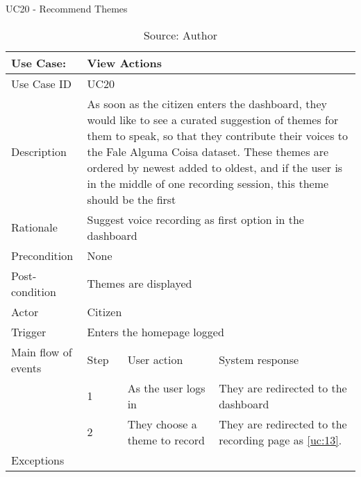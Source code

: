 \begin{table}[h]
\centering
\caption{UC20 - Recommend Themes}
\label{uc:20}
\begin{tabular}{|p{3cm}|p{1cm}|p{5cm}|p{5cm}|}
\hline
Use Case:       & \multicolumn{3}{p{11cm}|}{View Actions} \\ \hline
Use Case ID     & \multicolumn{3}{p{11cm}|}{UC20} \\ \hline
Description     & \multicolumn{3}{p{11cm}|}{As soon as the citizen enters the dashboard, they would like to see a curated suggestion of themes for them to speak, so that they contribute their voices to the Fale Alguma Coisa dataset. These themes are ordered by newest added to oldest, and if the user is in the middle of one recording session, this theme should be the first} \\ \hline
Rationale       & \multicolumn{3}{p{11cm}|}{Suggest voice recording as first option in the dashboard} \\ \hline
Precondition    & \multicolumn{3}{p{11cm}|}{None} \\ \hline
Post-condition  & \multicolumn{3}{p{11cm}|}{Themes are displayed} \\ \hline
Actor           & \multicolumn{3}{p{11cm}|}{Citizen} \\ \hline
Trigger         & \multicolumn{3}{p{11cm}|}{Enters the homepage logged} \\ \hline
Main flow of events & Step  & User action & System response \\ \hline
                    & 1     & As the user logs in & They are redirected to the dashboard \\ \hline
                    & 2     & They choose a theme to record & They are redirected to the recording page as \ref{uc:13}. \\ \hline
Exceptions      & \multicolumn{3}{p{11cm}|}{} \\ \hline
\end{tabular}
\caption*{Source: Author}
\end{table}

